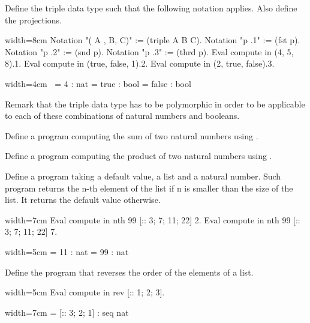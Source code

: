 \begin{Exercise}[label=ex:triple,difficulty=0,title={The triple data type}]
Define the triple data type such that the following notation
applies.  Also define the projections.

\begin{coq}{}{width=8cm}
Notation "( A , B, C)" := (triple A B C).
Notation "p .1" := (fst p).
Notation "p .2" := (snd p).
Notation "p .3" := (thrd p).
Eval compute in (4, 5, 8).1.
Eval compute in (true, false, 1).2.
Eval compute in (2, true, false).3.
\end{coq}
\begin{coqout}{}{width=4cm}
$~$
     = 4 : nat
     = true : bool
     = false : bool
\end{coqout}
Remark that the triple data type has to be polymorphic in order to
be applicable to each of these combinations of natural numbers and
booleans.
\end{Exercise}

\begin{Exercise}[label=ex:iteradd,difficulty=0,title={Addition with iteration}]
Define a program computing the sum of two natural numbers
using .
\end{Exercise}

\begin{Exercise}[label=ex:itermul,difficulty=0,title={Multiplication with iteration}]
Define a program computing the product of two natural numbers
using .
\end{Exercise}

\begin{Exercise}[label=ex:nth,difficulty=0,title={Find the n-th element}]
Define a program taking a default value, a list and  a natural number.  Such
program returns the n-th element of the list if n is smaller than the size of
the list.  It returns the default value otherwise.

\begin{coq}{}{width=7cm}
Eval compute in
  nth 99 [:: 3; 7; 11; 22] 2.
Eval compute in
  nth 99 [:: 3; 7; 11; 22] 7.
\end{coq}
\begin{coqout}{}{width=5cm}
     = 11
     : nat
     = 99
     : nat
\end{coqout}
\end{Exercise}

\begin{Exercise}[label=ex:rev,difficulty=0,title={List reversal}]
Define the program  that reverses the order of the elements
of a list.

\begin{coq}{}{width=5cm}
Eval compute in
  rev [:: 1; 2; 3].
\end{coq}
\begin{coqout}{}{width=7cm}
 = [:: 3; 2; 1]
 : seq nat
\end{coqout}
\end{Exercise}

